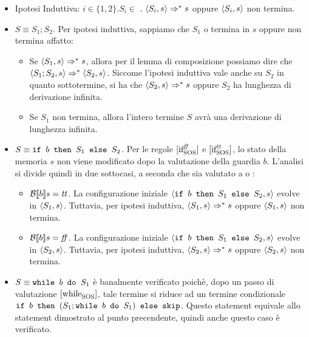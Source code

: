 \begin{itemize}
  \item Ipotesi Induttiva: $i \in \{1,2\}.S_i \in$ \stmm.
$\confSs{S_i}{s} 
\Rar{*} s$ oppure $\confSs{S_i}{s}$ non termina.
  \item $S \equiv{} S_1; S_2$. Per ipotesi induttiva, sappiamo che $S_1$ o
  termina in $s$ oppure non termina affatto:
  \begin{itemize}
    \item Se $\confSs{S_1}{s} \Rar{*} s$, allora per il lemma di composizione
      possiamo dire che $\confSs{S_1;S_2}{s} \Rar{*} \confSs{S_2}{s}$. Siccome
      l'ipotesi induttiva vale anche su $S_2$ in quanto sottotermine, si ha che
      $\confSs{S_2}{s} \Rar{*} s$ oppure $S_2$ ha lunghezza di derivazione
      infinita.
    \item Se $S_1$ non termina, allora l'intero termine $S$ avrà una
      derivazione di lunghezza infinita.
  \end{itemize}

  \item $S \equiv{} \ifABC{b}{S_1}{S_2}$. Per le regole $\ifffSOS{}$ e
    $\ifttSOS{}$, lo stato della memoria $s$ non viene modificato dopo la
    valutazione della guardia $b$. L'analisi si divide quindi in due sottocasi,
    a seconda che  sia valutato a \semtrue{} o \semfalse{}:
    \begin{itemize}
      \item $\B{b} = \semtrue{}$. La configurazione iniziale
        $\confSs{\ifABC{b}{S_1}{S_2}}{s}$ evolve in
        $\confSs{S_1}{s}$. Tuttavia, per ipotesi induttiva,
        $\confSs{S_1}{s} \Rar{*} s$ oppure $\confSs{S_1}{s}$ non termina.
      \item $\B{b} = \semfalse{}$. La configurazione iniziale
        $\confSs{\ifABC{b}{S_1}{S_2}}{s}$ evolve in
        $\confSs{S_2}{s}$. Tuttavia, per ipotesi induttiva,
        $\confSs{S_2}{s} \Rar{*} s$ oppure $\confSs{S_2}{s}$ non termina.
    \end{itemize}

  \item $S \equiv{} \wbS{b}{S_1}$ è banalmente verificato poichè, dopo un passo
    di valutazione $\whileSOS$, tale termine si riduce ad un termine condizionale
    $\ifABC{b}{(S_1;\wbS{b}{S_1})}{\skipForFriends}$. Questo statement equivale
    allo statement dimostrato al punto precendente, quindi anche questo caso è 
    verificato.
\end{itemize}

\undef{\stmm}
